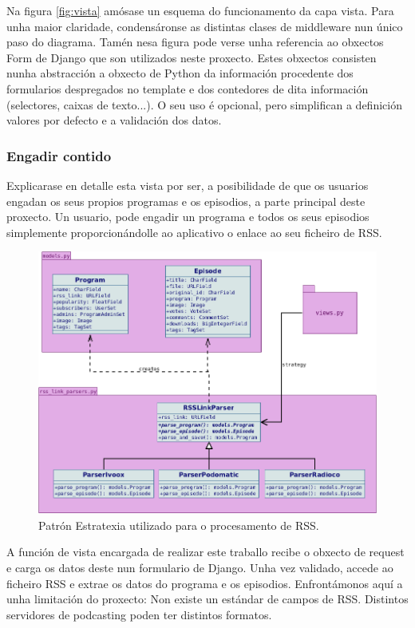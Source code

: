 Na figura \ref{fig:vista} amósase un esquema do funcionamento da capa vista. Para unha maior claridade, condensáronse as distintas clases de middleware nun único paso do diagrama. Tamén nesa figura pode verse unha referencia ao obxectos Form de Django que son utilizados neste proxecto. Estes obxectos consisten nunha abstracción a obxecto de Python da información procedente dos formularios despregados no template e dos contedores de dita información (selectores, caixas de texto...). O seu uso é opcional, pero simplifican a definición valores por defecto e a validación dos datos. 




\subsubsection{Engadir contido}
\label{rss_parser_section}

Explicarase en detalle esta vista por ser, a posibilidade de que os usuarios engadan os seus propios programas e os episodios, a parte principal deste proxecto. Un usuario, pode engadir un programa e todos os seus episodios simplemente proporcionándolle ao aplicativo o enlace ao seu ficheiro de RSS.

\begin{figure}[h]
	\centering
	\includegraphics[scale=0.45,keepaspectratio=true]{./images/strategy.png}
	\caption{Patrón Estratexia utilizado para o procesamento de RSS.}
	\label{fig:strategy}
\end{figure}

A función de vista encargada de realizar este traballo recibe o obxecto de request e carga os datos deste nun formulario de Django. Unha vez validado, accede ao ficheiro RSS e extrae os datos do programa e os episodios. Enfrontámonos aquí a unha limitación do proxecto: Non existe un estándar de campos de RSS. Distintos servidores de podcasting poden ter distintos formatos.

